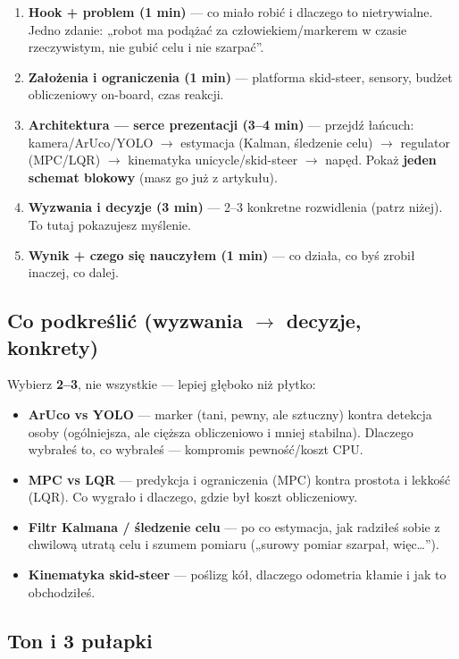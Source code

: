 \documentclass[11pt]{article}
\newcommand{\ra}{$\rightarrow$}
\begin{document}
\begin{enumerate}
  \item \textbf{Hook + problem (1 min)} --- co miało robić i dlaczego to nietrywialne. Jedno zdanie: „robot ma podążać za człowiekiem/markerem w czasie rzeczywistym, nie gubić celu i nie szarpać”.
  \item \textbf{Założenia i ograniczenia (1 min)} --- platforma skid-steer, sensory, budżet obliczeniowy on-board, czas reakcji.
  \item \textbf{Architektura --- serce prezentacji (3--4 min)} --- przejdź łańcuch: kamera/ArUco/YOLO \ra{} estymacja (Kalman, śledzenie celu) \ra{} regulator (MPC/LQR) \ra{} kinematyka unicycle/skid-steer \ra{} napęd. Pokaż \textbf{jeden schemat blokowy} (masz go już z artykułu).
  \item \textbf{Wyzwania i decyzje (3 min)} --- 2--3 konkretne rozwidlenia (patrz niżej). To tutaj pokazujesz myślenie.
  \item \textbf{Wynik + czego się nauczyłem (1 min)} --- co działa, co byś zrobił inaczej, co dalej.
\end{enumerate}

\subsection{Co podkreślić (wyzwania \ra{} decyzje, konkrety)}

Wybierz \textbf{2--3}, nie wszystkie --- lepiej głęboko niż płytko:

\begin{itemize}
  \item \textbf{ArUco vs YOLO} --- marker (tani, pewny, ale sztuczny) kontra detekcja osoby (ogólniejsza, ale cięższa obliczeniowo i mniej stabilna). Dlaczego wybrałeś to, co wybrałeś --- kompromis pewność/koszt CPU.
  \item \textbf{MPC vs LQR} --- predykcja i ograniczenia (MPC) kontra prostota i lekkość (LQR). Co wygrało i dlaczego, gdzie był koszt obliczeniowy.
  \item \textbf{Filtr Kalmana / śledzenie celu} --- po co estymacja, jak radziłeś sobie z chwilową utratą celu i szumem pomiaru („surowy pomiar szarpał, więc\ldots”).
  \item \textbf{Kinematyka skid-steer} --- poślizg kół, dlaczego odometria kłamie i jak to obchodziłeś.
\end{itemize}

\subsection{Ton i 3 pułapki}
\end{document}
